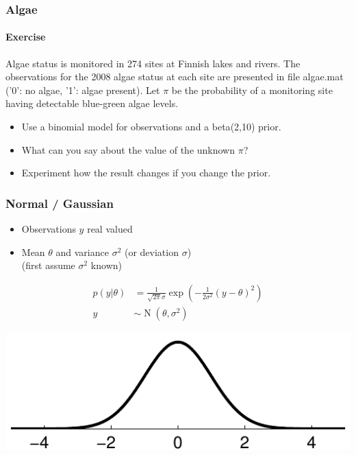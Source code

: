 \documentclass[english,t]{beamer}
\renewcommand{\emph}[1]{\textcolor{navyblue}{#1}}
\DeclareMathOperator{\N}{N}
\begin{document}
\begin{frame}
  \frametitle{Algae}
  \framesubtitle{Exercise}

Algae status is monitored in 274 sites at Finnish lakes and rivers. 
The observations for the 2008 algae status at each site are presented
in file \emph{algae.mat} ('0': no algae, '1': algae present). 
Let $\pi$ be the probability of a monitoring site having detectable
blue-green algae levels. 

\begin{itemize}
\item Use a binomial model for observations and a \emph{beta}(2,10) prior.
\item What can you say about the value of the unknown $\pi$?
\item Experiment how the result changes if you change the prior.
\end{itemize}

\end{frame}

\begin{frame}
  \frametitle{Normal / Gaussian}

  \begin{itemize}
  \item Observations $y$ real valued
  \item Mean $\theta$ and variance $\sigma^2$ (or deviation $\sigma$)\\
    (first assume $\sigma^2$ known)
  \end{itemize}
  \vskip -2mm
  \begin{align*}
    p(y|\theta)&=\frac{1}{\sqrt{2\pi}\sigma}\exp\left(-\frac{1}{2\sigma^2}(y-\theta)^2\right)\\
    y & \sim \N(\theta,\sigma^2)
  \end{align*}

  \begin{center}
      \includegraphics[clip]{kuva2b_1}
  \end{center}
\end{frame}
\end{document}
